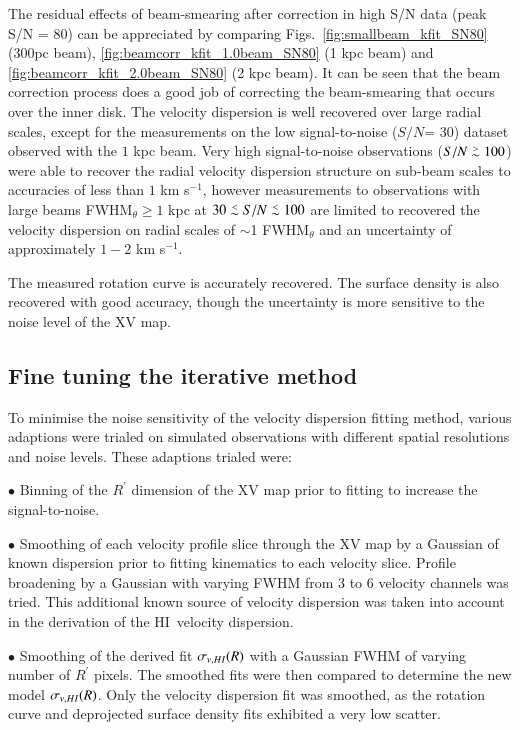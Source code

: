 \documentclass[traditabstract]{aa} %
\newcommand\lesim{\lower.5ex\hbox{$\; \buildrel < \over \sim \;$}}
\newcommand\gesim{\lower.5ex\hbox{$\; \buildrel > \over \sim \;$}}
\newcommand\HI{H{\small I}}
\newcommand\kms{km s$^{-1}$}
\begin{document}
The residual effects of beam-smearing after
 correction in high S/N data (peak S/N = 80) can be appreciated by
 comparing Figs.~\ref{fig:smallbeam_kfit_SN80} (300pc beam), 
\ref{fig:beamcorr_kfit_1.0beam_SN80} (1 kpc beam) and 
\ref{fig:beamcorr_kfit_2.0beam_SN80} (2 kpc beam).
It can be seen that the beam correction process does a good job of
correcting the beam-smearing that occurs over the inner disk. The
velocity dispersion is well recovered over large radial scales, except
for the measurements on the low signal-to-noise ($S/N$= 30) dataset
observed with the $1$ kpc beam. Very high signal-to-noise observations
($S/N \gesim 100$) were able to recover the radial velocity dispersion
structure on sub-beam scales to accuracies of less than $1$ \kms,
however measurements to observations with large beams FWHM$_{\theta}
\ge 1$ kpc at $30 \lesim S/N \lesim 100$ are limited to recovered the
velocity dispersion on radial scales of $\sim$1 FWHM$_{\theta}$ and an
uncertainty of approximately $1-2$ \kms.

The measured rotation curve is accurately recovered. 
The surface density is also recovered with good accuracy,
though the uncertainty is more sensitive to the noise level of the XV
map.


\subsection{Fine tuning the iterative method}
\label{sec:ch4-disc-finetuning}

To minimise the noise sensitivity of the velocity dispersion fitting 
method, various adaptions were trialed on simulated observations with 
different spatial resolutions and noise levels. These 
adaptions trialed were:

$\bullet $ Binning of the $R^{\prime}$ dimension of the XV map 
prior to fitting to
  increase the signal-to-noise.

$\bullet $ Smoothing of each velocity profile slice through the XV map by a
  Gaussian of known dispersion prior to fitting kinematics to each
  velocity slice. Profile broadening by a Gaussian with varying FWHM from 
  3 to 6 velocity channels was tried. This additional known source of  velocity 
  dispersion was taken into account in the derivation of the \HI\ 
velocity dispersion.

$\bullet $ Smoothing of the derived fit $\sigma_{v,\HI}(R)$ with a Gaussian
  FWHM of varying number of $R^{\prime}$ pixels. The smoothed fits
  were then compared to determine the new model $\sigma_{v,\HI}(R)$.
  Only the velocity dispersion fit was smoothed, as the rotation curve
  and deprojected surface density fits exhibited a very low scatter.
\end{document}
